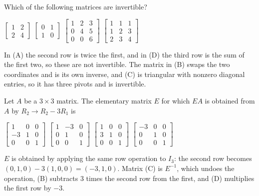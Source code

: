 \begin{question}[id=mat-12, type=msq, marks=2]
Which of the following matrices are invertible?
\begin{options}
  \option $\begin{bmatrix} 1 & 2 \\ 2 & 4 \end{bmatrix}$
  \correct $\begin{bmatrix} 0 & 1 \\ 1 & 0 \end{bmatrix}$
  \correct $\begin{bmatrix} 1 & 2 & 3 \\ 0 & 4 & 5 \\ 0 & 0 & 6 \end{bmatrix}$
  \option $\begin{bmatrix} 1 & 1 & 1 \\ 1 & 2 & 3 \\ 2 & 3 & 4 \end{bmatrix}$
\end{options}
\begin{solution}
In (A) the second row is twice the first, and in (D) the third row is the sum of the first two, so these are not invertible. The matrix in (B) swaps the two coordinates and is its own inverse, and (C) is triangular with nonzero diagonal entries, so it has three pivots and is invertible.
\end{solution}
\end{question}

\begin{question}[id=mat-13]
Let $A$ be a $3 \times 3$ matrix. The elementary matrix $E$ for which $EA$ is obtained from $A$ by $R_2 \to R_2 - 3R_1$ is
\begin{options}
  \correct $\begin{bmatrix} 1 & 0 & 0 \\ -3 & 1 & 0 \\ 0 & 0 & 1 \end{bmatrix}$
  \option $\begin{bmatrix} 1 & -3 & 0 \\ 0 & 1 & 0 \\ 0 & 0 & 1 \end{bmatrix}$
  \option $\begin{bmatrix} 1 & 0 & 0 \\ 3 & 1 & 0 \\ 0 & 0 & 1 \end{bmatrix}$
  \option $\begin{bmatrix} -3 & 0 & 0 \\ 0 & 1 & 0 \\ 0 & 0 & 1 \end{bmatrix}$
\end{options}
\begin{solution}
$E$ is obtained by applying the same row operation to $I_3$: the second row becomes $(0, 1, 0) - 3(1, 0, 0) = (-3, 1, 0)$. Matrix (C) is $E^{-1}$, which undoes the operation, (B) subtracts 3 times the second row from the first, and (D) multiplies the first row by $-3$.
\end{solution}
\end{question}

